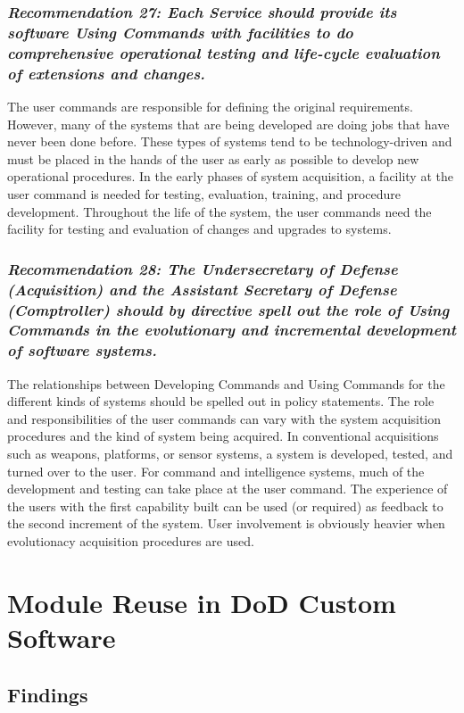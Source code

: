 \documentclass[12pt,final]{article}
\begin{document}
\subsubsection*{\textit{Recommendation 27: Each Service should provide its
software Using Commands with facilities to do comprehensive operational testing
and life-cycle evaluation of extensions and changes.}}

The user commands are responsible for defining the original requirements.
However, many of the systems that are being developed are doing jobs that have
never been done before. These types of systems tend to be technology-driven and
must be placed in the hands of the user as early as possible to develop new
operational procedures. In the early phases of system acquisition, a facility
at the user command is needed for testing, evaluation, training, and procedure
development. Throughout the life of the system, the user commands need the
facility for testing and evaluation of changes and upgrades to systems.

\subsubsection*{\textit{Recommendation 28: The Undersecretary of Defense
(Acquisition) and the Assistant Secretary of Defense (Comptroller) should by
directive spell out the role of Using Commands in the evolutionary and
incremental development of software systems.}}

The relationships between Developing Commands and Using Commands for the
different kinds of systems should be spelled out in policy statements. The role
and responsibilities of the user commands can vary with the system acquisition
procedures and the kind of system being acquired. In conventional acquisitions
such as weapons, platforms, or sensor systems, a system is developed, tested,
and turned over to the user.  For command and intelligence systems, much of the
development and testing can take place at the user command. The experience of
the users with the first capability built can be used (or required) as feedback
to the second increment of the system. User involvement is obviously heavier
when evolutionacy acquisition procedures are used.

\section{Module Reuse in DoD Custom Software}

\subsection*{Findings}
\end{document}

